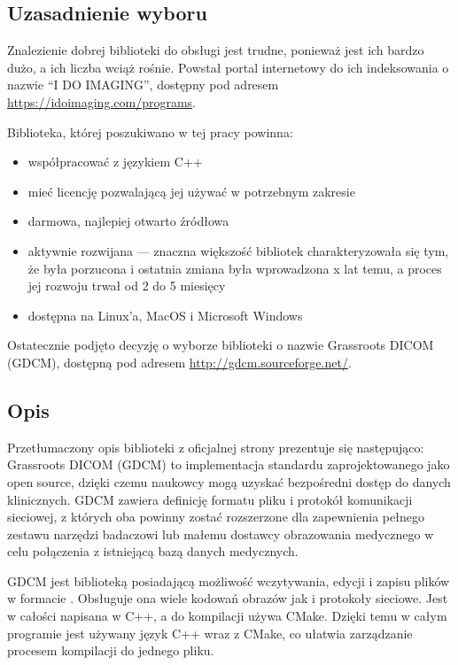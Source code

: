 

\subsection{Uzasadnienie wyboru}

\par
Znalezienie dobrej biblioteki do obsługi jest trudne, ponieważ jest ich bardzo dużo, a ich liczba wciąż rośnie.
Powstał portal internetowy do ich indeksowania o nazwie \enquote{I DO IMAGING}, dostępny pod adresem \url{https://idoimaging.com/programs}.
\par
Biblioteka, której poszukiwano w tej pracy powinna:
\begin{itemize}
    \item współpracować z językiem C++
    \item mieć licencję pozwalającą jej używać w potrzebnym zakresie
    \item darmowa, najlepiej otwarto źródłowa
    \item aktywnie rozwijana --- znaczna większość bibliotek charakteryzowała się tym, że była porzucona i ostatnia zmiana była wprowadzona x lat temu, a proces jej rozwoju trwał od 2 do 5 miesięcy
    \item dostępna na Linux'a, MacOS i Microsoft Windows
\end{itemize}
Ostatecznie podjęto decyzję o wyborze biblioteki o nazwie Grassroots DICOM (GDCM), dostępną pod adresem \url{http://gdcm.sourceforge.net/}.

\subsection{Opis}

\par
Przetłumaczony opis biblioteki z oficjalnej strony prezentuje się następująco:
Grassroots DICOM (GDCM) to implementacja standardu \DICOM zaprojektowanego jako open source, dzięki czemu naukowcy mogą uzyskać bezpośredni dostęp do danych klinicznych.
GDCM zawiera definicję formatu pliku i protokół komunikacji sieciowej, z których oba powinny zostać rozszerzone dla zapewnienia pełnego zestawu narzędzi badaczowi lub małemu dostawcy obrazowania medycznego w celu połączenia z istniejącą bazą danych medycznych.

\par
GDCM jest biblioteką posiadającą możliwość wczytywania, edycji i zapisu plików w formacie \DICOM.
Obsługuje ona wiele kodowań obrazów jak i protokoły sieciowe.
Jest w całości napisana w C++, a do kompilacji używa CMake.
Dzięki temu w całym programie jest używany język C++ wraz z CMake, co ułatwia zarządzanie procesem kompilacji do jednego pliku.

